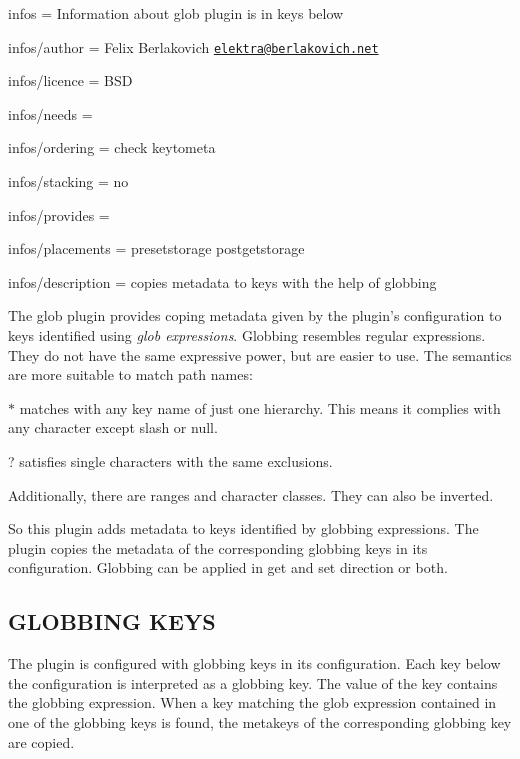 
\begin{DoxyItemize}
\item infos = Information about glob plugin is in keys below
\item infos/author = Felix Berlakovich \href{mailto:elektra@berlakovich.net}{\tt elektra@berlakovich.\+net}
\item infos/licence = B\+S\+D
\item infos/needs =
\item infos/ordering = check keytometa
\item infos/stacking = no
\item infos/provides =
\item infos/placements = presetstorage postgetstorage
\item infos/description = copies metadata to keys with the help of globbing
\end{DoxyItemize}

The glob plugin provides coping metadata given by the plugin's configuration to keys identified using {\itshape glob expressions}. Globbing resembles regular expressions. They do not have the same expressive power, but are easier to use. The semantics are more suitable to match path names\+:


\begin{DoxyItemize}
\item {\ttfamily $\ast$} matches with any key name of just one hierarchy. This means it complies with any character except slash or null.
\item {\ttfamily ?} satisfies single characters with the same exclusions.
\item Additionally, there are ranges and character classes. They can also be inverted.
\end{DoxyItemize}

So this plugin adds metadata to keys identified by globbing expressions. The plugin copies the metadata of the corresponding globbing keys in its configuration. Globbing can be applied in get and set direction or both.

\subsection*{G\+L\+O\+B\+B\+I\+N\+G K\+E\+Y\+S}

The plugin is configured with globbing keys in its configuration. Each key below the configuration is interpreted as a globbing key. The value of the key contains the globbing expression. When a key matching the glob expression contained in one of the globbing keys is found, the metakeys of the corresponding globbing key are copied.

